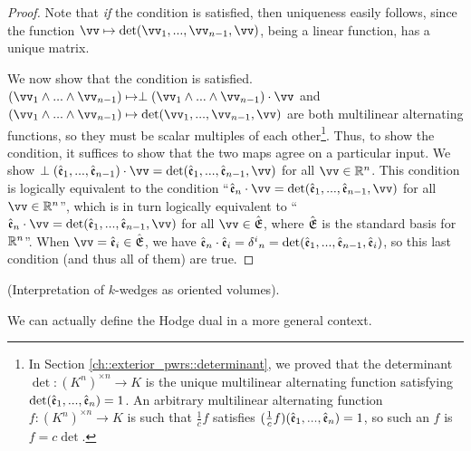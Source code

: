 \begin{proof}
        Note that \textit{if} the condition is satisfied, then uniqueness easily follows, since the function $\vv \mapsto \det(\vv_1, ..., \vv_{n - 1}, \vv)$, being a linear function, has a unique matrix.
        
        We now show that the condition is satisfied. $(\vv_1 \wedge ... \wedge \vv_{n - 1}) \mapsto \perp(\vv_1 \wedge ... \wedge \vv_{n - 1}) \cdot \vv$ and $(\vv_1 \wedge ... \wedge \vv_{n - 1}) \mapsto \det(\vv_1, ..., \vv_{n - 1}, \vv)$ are both multilinear alternating functions, so they must be scalar multiples of each other\footnote{In Section \ref{ch::exterior_pwrs::determinant}, we proved that the determinant $\det:(K^n)^{\times n} \rightarrow K$ is the unique multilinear alternating function satisfying $\det(\hat{\mathfrak{e}}_1, ..., \hat{\mathfrak{e}}_n) = 1$. An arbitrary multilinear alternating function $f:(K^n)^{\times n} \rightarrow K$ is such that $\frac{1}{c}f$ satisfies $(\frac{1}{c}f)(\hat{\mathfrak{e}}_1, ..., \hat{\mathfrak{e}}_n) = 1$, so such an $f$ is $f = c \det$.}. Thus, to show the condition, it suffices to show that the two maps agree on a particular input. We show $\perp(\see_1, ..., \see_{n - 1}) \cdot \vv = \det(\see_1, ..., \see_{n - 1}, \vv)$ for all $\vv \in \R^n$. This condition is logically equivalent to the condition ``$\see_n \cdot \vv = \det(\see_1, ..., \see_{n - 1}, \vv)$ for all $\vv \in \R^n$'', which is in turn logically equivalent to ``$\see_n \cdot \vv = \det(\see_1, ..., \see_{n - 1}, \vv)$ for all $\vv \in \sE$, where ${\hat{\mathfrak{E}}}$ is the standard basis for $\mathbb{R}^n$''.  When $\vv = \see_i \in \sE$, we have $\hat{\mathfrak{e}}_n \cdot \hat{\mathfrak{e}}_i = \delta^i{}_n = \det(\hat{\mathfrak{e}}_1, ..., \hat{\mathfrak{e}}_{n - 1}, \hat{\mathfrak{e}}_i)$, so this last condition (and thus all of them) are true.
\end{proof}

\begin{remark}
    (Interpretation of $k$-wedges as oriented volumes).
\end{remark}

We can actually define the Hodge dual in a more general context.


